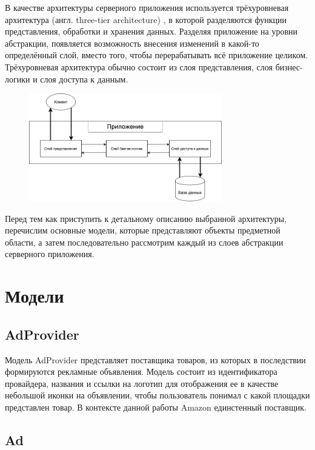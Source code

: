 \documentclass[times]{itmo-student-thesis}
\begin{document}
В качестве архитектуры серверного приложения используется трёхуровневая архитектура (англ. three-tier architecture) \cite{three-tier-architecture}, в которой разделяются функции представления, обработки и хранения данных. Разделяя приложение на уровни абстракции, появляется возможность внесения изменений в какой-то определённый слой, вместо того, чтобы перерабатывать всё приложение целиком. Трёхуровневая архитектура обычно состоит из слоя представления, слоя бизнес-логики и слоя доступа к данным.

\begin{figure}[h]
\includegraphics[width=0.75\textwidth]{three-tier-architecture}
\centering
\end{figure}

Перед тем как приступить к детальному описанию выбранной архитектуры, перечислим основные модели, которые представляют объекты предметной области, а затем последовательно рассмотрим каждый из слоев абстракции серверного приложения. 




\section{Модели}\label{sec:models}

\subsection{AdProvider}

 Модель AdProvider представляет поставщика товаров, из которых в последствии формируются рекламные объявления. Модель состоит из идентификатора провайдера, названия и ссылки на логотип для отображения ее в качестве небольшой иконки на объявлении, чтобы пользователь понимал с какой площадки представлен товар. В контексте данной работы Amazon единстенный поставщик.

\subsection{Ad}
\end{document}
